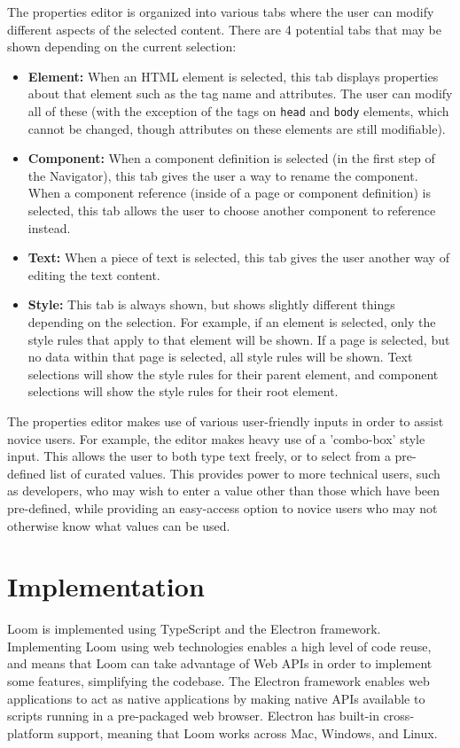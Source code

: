 \documentclass[conference, letterpaper]{IEEEtran}
\begin{document}
The properties editor is organized into various tabs where the user can modify different aspects of the selected content. There are 4 potential tabs that may be shown depending on the current selection:
\begin{itemize}
  \item \textbf{Element:} When an HTML element is selected, this tab displays properties about that element such as the tag name and attributes. The user can modify all of these (with the exception of the tags on \texttt{head} and \texttt{body} elements, which cannot be changed, though attributes on these elements are still modifiable).
  \item \textbf{Component:} When a component definition is selected (in the first step of the Navigator), this tab gives the user a way to rename the component. When a component reference (inside of a page or component definition) is selected, this tab allows the user to choose another component to reference instead.
  \item \textbf{Text:} When a piece of text is selected, this tab gives the user another way of editing the text content.
  \item \textbf{Style:} This tab is always shown, but shows slightly different things depending on the selection. For example, if an element is selected, only the style rules that apply to that element will be shown. If a page is selected, but no data within that page is selected, all style rules will be shown. Text selections will show the style rules for their parent element, and component selections will show the style rules for their root element.
\end{itemize}

The properties editor makes use of various user-friendly inputs in order to assist novice users. For example, the editor makes heavy use of a 'combo-box' style input. This allows the user to both type text freely, or to select from a pre-defined list of curated values. This provides power to more technical users, such as developers, who may wish to enter a value other than those which have been pre-defined, while providing an easy-access option to novice users who may not otherwise know what values can be used.

\section{Implementation}
Loom is implemented using TypeScript\cite{TypeScript} and the Electron\cite{Electron} framework. Implementing Loom using web technologies enables a high level of code reuse, and means that Loom can take advantage of Web APIs in order to implement some features, simplifying the codebase. The Electron framework enables web applications to act as native applications by making native APIs available to scripts running in a pre-packaged web browser. Electron has built-in cross-platform support, meaning that Loom works across Mac, Windows, and Linux.
\end{document}
